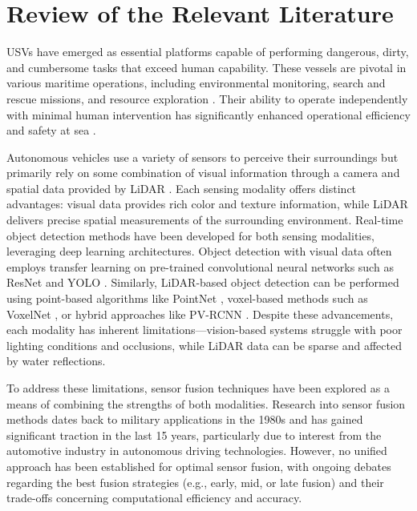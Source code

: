 \documentclass{erauthesis}
\begin{document}
\chapter{Review of the Relevant Literature}


\acp{USV} have emerged as essential platforms capable of performing dangerous, dirty, and cumbersome tasks that exceed human capability. These vessels are pivotal in various maritime operations, including environmental monitoring, search and rescue missions, and resource exploration \cite{liebergall, eckstein2024}.%
Their ability to operate independently with minimal human intervention has significantly enhanced operational efficiency and safety at sea \cite{bai2022}.%

Autonomous vehicles use a variety of sensors to perceive their surroundings but primarily rely on some combination of visual information through a camera and spatial data provided by \ac{LiDAR} \cite{yeong2021}.%
Each sensing modality offers distinct advantages: visual data provides rich color and texture information, while \ac{LiDAR} delivers precise spatial measurements of the surrounding environment.
Real-time object detection methods have been developed for both sensing modalities, leveraging deep learning architectures.
Object detection with visual data often employs transfer learning on pre-trained convolutional neural networks such as ResNet \cite{he2016} and \ac{YOLO} \cite{ultralytics}.%
Similarly, \ac{LiDAR}-based object detection can be performed using point-based algorithms like PointNet \cite{garcia-garcia2016}, voxel-based methods such as VoxelNet \cite{zhou2018a}, or hybrid approaches like PV-RCNN \cite{shi2021}.%
Despite these advancements, each modality has inherent limitations—vision-based systems struggle with poor lighting conditions and occlusions, while \ac{LiDAR} data can be sparse and affected by water reflections.

To address these limitations, sensor fusion techniques have been explored as a means of combining the strengths of both modalities. 
Research into sensor fusion methods dates back to military applications in the 1980s and has gained significant traction in the last 15 years, particularly due to interest from the automotive industry in autonomous driving technologies. However, no unified approach has been established for optimal sensor fusion, with ongoing debates regarding the best fusion strategies (e.g., early, mid, or late fusion) and their trade-offs concerning computational efficiency and accuracy.
\end{document}

